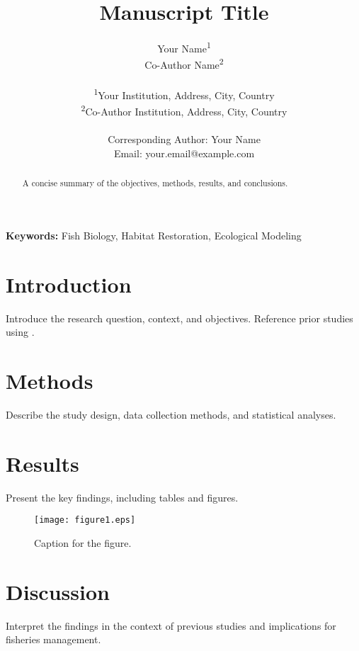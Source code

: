 \documentclass[12pt]{article}
\begin{document}
\title{Manuscript Title}
\author{
    Your Name\textsuperscript{1} \\
    Co-Author Name\textsuperscript{2} \\
    \\
    \textsuperscript{1}Your Institution, Address, City, Country \\
    \textsuperscript{2}Co-Author Institution, Address, City, Country \\
    \\
    Corresponding Author: Your Name \\
    Email: your.email@example.com
}
\date{}
\maketitle

\begin{abstract}
A concise summary of the objectives, methods, results, and conclusions.
\end{abstract}

\noindent\textbf{Keywords:} Fish Biology, Habitat Restoration, Ecological Modeling

\doublespacing

\section{Introduction}
Introduce the research question, context, and objectives. Reference prior studies using \citet{example_reference}.

\section{Methods}
Describe the study design, data collection methods, and statistical analyses.

\section{Results}
Present the key findings, including tables and figures.

\begin{figure}[h]
    \centering
    \texttt{[image: figure1.eps]}
    \caption{Caption for the figure.}
    \label{fig:figure1}
\end{figure}

\section{Discussion}
Interpret the findings in the context of previous studies and implications for fisheries management.
\end{document}
